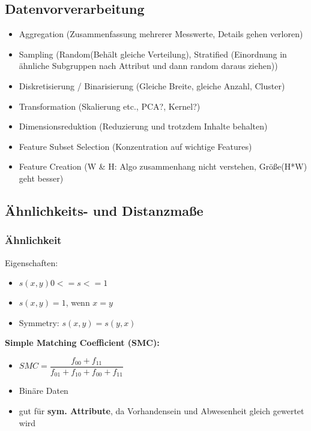 \documentclass[a4paper]{article}
\begin{document}
\begin{landscape}
\begin{multicols}{3}
    \subsection{Datenvorverarbeitung}

    \begin{itemize}[noitemsep,nolistsep]
        \item Aggregation (Zusammenfassung mehrerer Messwerte, Details gehen verloren)
        \item Sampling (Random(Behält gleiche Verteilung), Stratified (Einordnung in ähnliche Subgruppen nach Attribut und dann random daraus ziehen))
        \item Diskretisierung / Binarisierung (Gleiche Breite, gleiche Anzahl, Cluster)
        \item Transformation (Skalierung etc., PCA?, Kernel?)
        \item Dimensionsreduktion (Reduzierung und trotzdem Inhalte behalten)
        \item Feature Subset Selection (Konzentration auf wichtige Features)
        \item Feature Creation (W \& H: Algo zusammenhang nicht verstehen, Größe(H*W) geht besser)
    \end{itemize}

    \subsection{Ähnlichkeits- und Distanzmaße}
            \subsubsection{Ähnlichkeit}

            Eigenschaften:
            \begin{itemize}[noitemsep,nolistsep]
                \item $s(x,y) 0 <= s <= 1$
                \item $s(x,y) = 1$, wenn $x = y$
                \item Symmetry: $s(x,y) = s(y,x)$
            \end{itemize}

            \textbf{Simple Matching Coefficient (SMC):}
            \begin{itemize}[noitemsep,nolistsep]
                \item $ SMC = \dfrac{f_{00}+f_{11}}{f_{01}+ f_{10}+ f_{00}+ f_{11}} $
                \item Binäre Daten
                \item gut für \textbf{sym. Attribute}, da Vorhandensein und Abwesenheit gleich gewertet wird
            \end{itemize}


\end{multicols}
\end{landscape}
\end{document}
